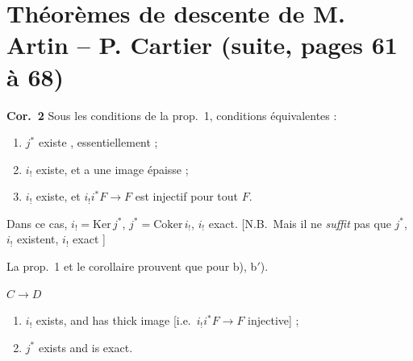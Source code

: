 \documentclass[11pt,a4paper]{article}
\begin{document}
\section*{Théorèmes de descente de M. Artin – P. Cartier (suite, pages 61 à 68)}


\textbf{Cor.\ 2} Sous les conditions de la prop.\ 1, conditions équivalentes :

\begin{enumerate}
\item[a)] $j^{*}$ existe , essentiellement  ;
\item[b)] $i_{!}$ existe, et a une image épaisse ;
\item[b$'$)] $i_{!}$ existe, et $i_{!} i^{*} F \to F$ est injectif pour tout $F$.
\end{enumerate}

Dans ce cas, $i_{!} = \mathrm{Ker}\, j^{*}$, $j^{*} = \mathrm{Coker}\, i_{!}$,
\ill{}  $i_{!}$ exact. [N.B.\ Mais il ne \emph{suffit} pas
que $j^{*}$, $i_{!}$ existent, $i_{!}$ exact \ill{}]

La prop.\ 1 et le corollaire prouvent que \ill{} \ill{} pour b), b$'$).


$C \longrightarrow D$


\begin{enumerate}
\item[a)] $i_{!}$ exists, and has thick image [i.e.\ $i_{!} i^{*} F \to F$
      injective] ;
\item[b)] $j^{*}$ exists and is exact.
\end{enumerate}

\end{document}
